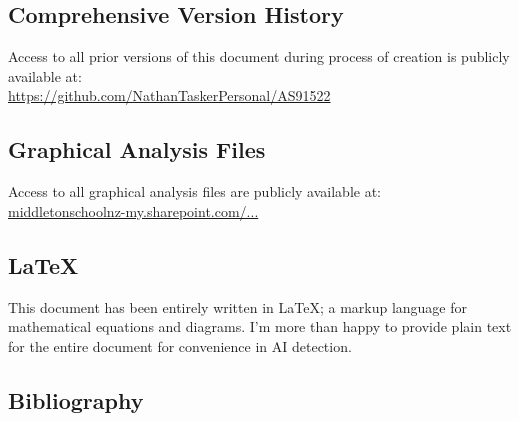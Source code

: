 \documentclass[11pt, a4paper]{article}
\begin{document}
	\subsection{Comprehensive Version History}
	Access to all prior versions of this document during process of creation is publicly available at:\\
	\url{https://github.com/NathanTaskerPersonal/AS91522}
	\subsection{Graphical Analysis Files}
	Access to all graphical analysis files are publicly available at:\\
	\href{https://middletonschoolnz-my.sharepoint.com/:f:/g/personal/taskern_middleton_school_nz/EhEmw21C2L9Fn9BYUy2ccwMBn6xCUF93vtfvtT_5_rkxbA?e=Tp02lP}{middletonschoolnz-my.sharepoint.com/...}
	\subsection{\LaTeX}
	This document has been entirely written in \LaTeX; a markup language for mathematical equations and diagrams. I'm more than happy to provide plain text for the entire document for convenience in AI detection.
	\subsection{Bibliography}
\end{document}
